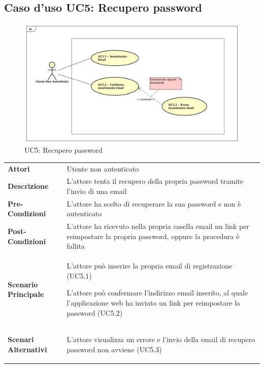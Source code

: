 \newpage
\subsection{Caso d'uso UC5: Recupero password }
\label{UC5}
\begin{figure}[ht]
	\centering
	\includegraphics[scale=0.45]{UML/UC5.png}
	\caption{UC5: Recupero password }
\end{figure}

\begin{longtable}{ l | p{11cm}}
	\hline
	\rowcolor{Gray}
	 \multicolumn{2}{c}{UC5 - Recupero password} \\
	 \hline
	\textbf{Attori} & Utente non autenticato \\
	\textbf{Descrizione} & L'attore tenta il recupero della propria password tramite l'invio di una email \\
	\textbf{Pre-Condizioni} & L'attore ha scelto di recuperare la sua password e non è autenticato \\
	\textbf{Post-Condizioni} & L'attore ha ricevuto nella propria casella email un link per reimpostare la propria password, oppure la procedura è fallita \\
	\textbf{Scenario Principale} & 
	\begin{enumerate*}[label=(\arabic*.),itemjoin={\newline}]
		\item L'attore può inserire la propria email di registrazione (UC5.1)
		\item L'attore può confermare l'indirizzo email inserito, al quale l'applicazione web ha inviato un link per reimpostare la password (UC5.2)
	\end{enumerate*}\\
	\textbf{Scenari Alternativi} & 
	\begin{enumerate*}[label=(\arabic*.),itemjoin={\newline}]
		\item L'attore visualizza un errore e l'invio della email di recupero password non avviene (UC5.3) 
	\end{enumerate*}\\
\end{longtable}